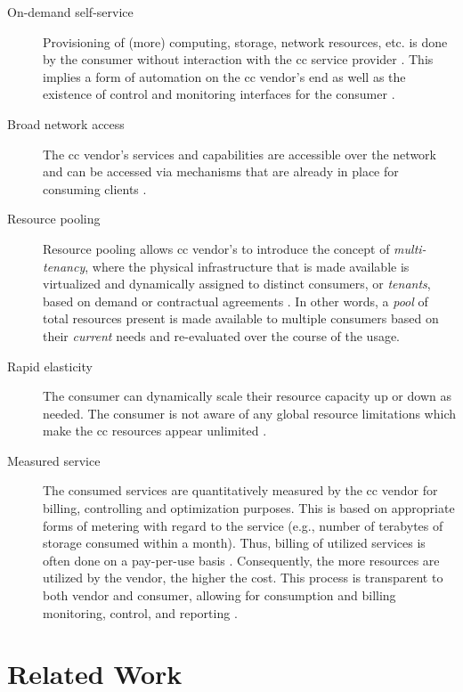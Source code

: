 \begin{description}
	\item[On-demand self-service] Provisioning of (more) computing, storage, network resources, etc. is done by the consumer without interaction with the \ac{cc} service provider \cite{mell_nist_2011}. This implies a form of automation on the \ac{cc} vendor's end as well as the existence of control and monitoring interfaces for the consumer \cite[p.\ 51]{sehgal_cloud_2018}. 
	\item[Broad network access] The \ac{cc} vendor's services and capabilities are accessible over the network and can be accessed via mechanisms that are already in place for consuming clients \cites{mell_nist_2011}[p.\ 45]{sehgal_cloud_2018}.
	\item[Resource pooling] Resource pooling allows \ac{cc} vendor's to introduce the concept of \textit{multi-tenancy}, where the physical infrastructure that is made available is virtualized and dynamically assigned to distinct consumers, or \textit{tenants}, based on demand or contractual agreements \cites{mell_nist_2011}[p.\ 45]{sehgal_cloud_2018}. 
		In other words, a \textit{pool} of total resources present is made available to multiple consumers based on their \textit{current} needs and re-evaluated over the course of the usage.
	\item[Rapid elasticity] The consumer can dynamically scale their resource capacity up or down as needed. The consumer is not aware of any global resource limitations which make the \ac{cc} resources appear unlimited \cite{mell_nist_2011}.
	\item[Measured service] The consumed services are quantitatively measured by the \ac{cc} vendor for billing, controlling and optimization purposes. This is based on appropriate forms of metering with regard to the service (e.g., number of terabytes of storage consumed within a month). Thus, billing of utilized services is often done on a pay-per-use basis \cite{mell_nist_2011}. Consequently, the more resources are utilized by the vendor, the higher the cost. This process is transparent to both vendor and consumer, allowing for consumption and billing monitoring, control, and reporting \cite{mell_nist_2011}.
\end{description}


\chapter{Related Work}
\label{ch:related-work}

